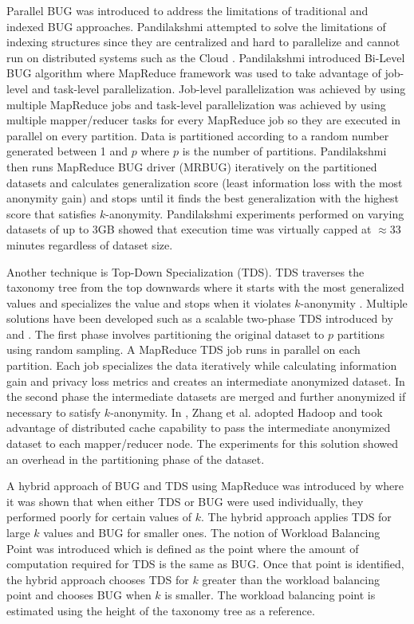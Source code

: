 \documentclass[11pt]{article}       %
\begin{document}
Parallel BUG was introduced to address the limitations of traditional and indexed BUG approaches. Pandilakshmi attempted to solve the limitations of indexing structures since they are centralized and hard to parallelize and cannot run on distributed systems such as the Cloud \cite{Pandilakshmi:2014}. Pandilakshmi introduced Bi-Level BUG algorithm where MapReduce framework was used to take advantage of job-level and task-level parallelization. Job-level parallelization was achieved by using multiple MapReduce jobs and task-level parallelization was achieved by using multiple mapper/reducer tasks for every MapReduce job so they are executed in parallel on every partition. Data is partitioned according to a random number generated between 1 and $p$ where $p$ is the number of partitions. Pandilakshmi then runs MapReduce BUG driver (MRBUG) iteratively on the partitioned datasets and calculates generalization score (least information loss with the most anonymity gain) and stops until it finds the best generalization with the highest score that satisfies $k$-anonymity. Pandilakshmi experiments performed on varying datasets of up to 3GB showed that execution time was virtually capped at $\approx$33 minutes regardless of dataset size.

Another technique is Top-Down Specialization (TDS). TDS traverses the taxonomy tree from the top downwards where it starts with the most generalized values and specializes the value and stops when it violates $k$-anonymity \cite{Fung:2005}. Multiple solutions have been developed such as a scalable two-phase TDS introduced by \cite{Priyanka:2014} and \cite{Zhang:2014}. The first phase involves partitioning the original dataset to $p$ partitions using random sampling. A MapReduce TDS job runs in parallel on each partition. Each job specializes the data iteratively while calculating information gain and privacy loss metrics and creates an intermediate anonymized dataset. In the second phase the intermediate datasets are merged and further anonymized if necessary to satisfy $k$-anonymity. In \cite{Zhang:2014}, Zhang et al. adopted Hadoop\textsuperscript{\textregistered} and took advantage of distributed cache capability to pass the intermediate anonymized dataset to each mapper/reducer node. The experiments for this solution showed an overhead in the partitioning phase of the dataset.

A hybrid approach of BUG and TDS using MapReduce was introduced by \cite{Zhang:2013} where it was shown that when either TDS or BUG were used individually, they performed poorly for certain values of $k$. The hybrid approach applies TDS for large $k$ values and BUG for smaller ones. The notion of Workload Balancing Point was introduced which is defined as the point where the amount of computation required for TDS is the same as BUG. Once that point is identified, the hybrid approach chooses TDS for $k$ greater than the workload balancing point and chooses BUG when $k$ is smaller. The workload balancing point is estimated using the height of the taxonomy tree as a reference.
\end{document}
